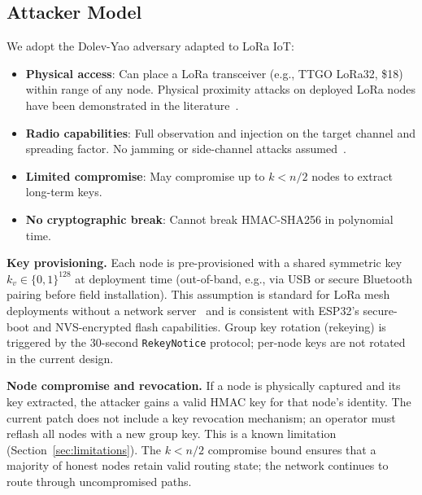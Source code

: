 \documentclass[10pt,journal,compsoc]{IEEEtran}
\begin{document}
\subsection{Attacker Model}

We adopt the Dolev-Yao adversary adapted to LoRa IoT:

\begin{itemize}
  \item \textbf{Physical access}: Can place a LoRa transceiver
    (e.g., TTGO LoRa32, \$18) within range of any node.
    Physical proximity attacks on deployed LoRa nodes have been
    demonstrated in the literature~\cite{ieee2025-lora-adversarial,bringye2026-lorawan-ids}.
  \item \textbf{Radio capabilities}: Full observation and injection
    on the target channel and spreading factor. No jamming or
    side-channel attacks assumed~\cite{ieee2025-lorawan-jamming-ids}.
  \item \textbf{Limited compromise}: May compromise up to $k < n/2$
    nodes to extract long-term keys.
  \item \textbf{No cryptographic break}: Cannot break HMAC-SHA256
    in polynomial time.
\end{itemize}

\textbf{Key provisioning.}
Each node is pre-provisioned with a shared symmetric key
$k_v \in \{0,1\}^{128}$ at deployment time (out-of-band, e.g.,
via USB or secure Bluetooth pairing before field installation).
This assumption is standard for LoRa mesh deployments without
a network server~\cite{shelby2026-zero-trust-iot} and is consistent
with ESP32's secure-boot and NVS-encrypted flash capabilities.
Group key rotation (rekeying) is triggered by the
30-second \texttt{RekeyNotice} protocol; per-node keys are not
rotated in the current design.

\textbf{Node compromise and revocation.}
If a node is physically captured and its key extracted,
the attacker gains a valid HMAC key for that node's identity.
The current patch does not include a key revocation mechanism;
an operator must reflash all nodes with a new group key.
This is a known limitation (Section~\ref{sec:limitations}).
The $k < n/2$ compromise bound ensures that a majority of honest
nodes retain valid routing state; the network continues to
route through uncompromised paths.
\end{document}
